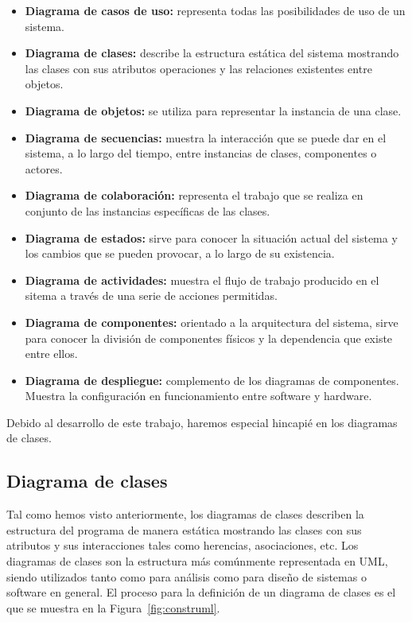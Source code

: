 \documentclass[a4paper, 12pt]{book}
\begin{document}
\begin{itemize}
  \item \textbf{Diagrama de casos de uso:} representa todas las posibilidades de uso de un sistema.
  \item \textbf{Diagrama de clases:} describe la estructura estática del sistema mostrando las clases con sus atributos
  operaciones y las relaciones existentes entre objetos.
  \item \textbf{Diagrama de objetos:} se utiliza para representar la instancia de una clase.
  \item \textbf{Diagrama de secuencias:} muestra la interacción que se puede dar en el sistema, a lo largo del tiempo, entre instancias de
  clases, componentes o actores.
  \item \textbf{Diagrama de colaboración:} representa el trabajo que se realiza en conjunto de las instancias específicas
  de las clases.
  \item \textbf{Diagrama de estados:} sirve para conocer la situación actual del sistema
  y los cambios que se pueden provocar, a lo largo de su existencia.
  \item \textbf{Diagrama de actividades:} muestra el flujo de trabajo producido en el sitema a través de una serie de acciones permitidas.
  \item \textbf{Diagrama de componentes:} orientado a la arquitectura del sistema, sirve para conocer la división
  de componentes físicos y la dependencia que existe entre ellos.
  \item \textbf{Diagrama de despliegue:} complemento de los diagramas de componentes. Muestra la configuración
  en funcionamiento entre software y hardware.
\end{itemize}

Debido al desarrollo de este trabajo, haremos especial hincapié en los diagramas de clases.

\subsection{Diagrama de clases}
\label{subsec:diagrama-de-clases}
Tal como hemos visto anteriormente, los diagramas de clases describen la estructura del programa de manera estática
mostrando las clases con sus atributos y sus interacciones tales como herencias, asociaciones, etc.
Los diagramas de clases son la estructura más comúnmente representada en UML, siendo utilizados
tanto como para análisis como para diseño de sistemas o software en general.
El proceso para la definición de un diagrama de clases es el que se muestra en la Figura~\ref{fig:construml}.
\end{document}
